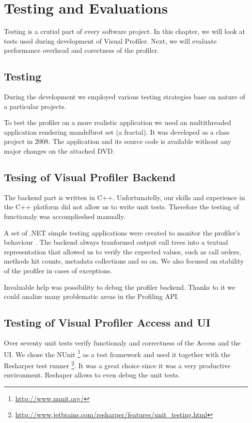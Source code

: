 \chapter{Testing and Evaluations}
Testing is a crutial part of every software project. In this chapter, we will look at tests used during development of Visual Profiler. Next, we will evaluate performance overhead and corectness of the profiler.

\section{Testing}
During the development we employed various testing strategies base on nature of a particular projects. 

To test the profiler on a more realistic application we used an multithreaded application rendering mandelbrot set (a fractal). It was developed as a class project in 2008. The application and its source code is available without any major changes on the attached DVD. 

\section{Tesing of Visual Profiler Backend}
The backend part is written in C++. Unfortunatelly, our skills and experience in the C++ platform did not allow us to write unit tests. Therefore the testing of functionaly was accomplieshed manually. 

A set of .NET simple testing applications were created to monitor  the profiler's behaviour . The backend always tranformed output call trees into a textual representation that allowed us to verify the expected values, such as call orders, methods hit counts, metadata collections and so on. We also focused on stability of the profiler in cases of exceptions.

Invaluable help was possibility to debug the profiler backend. Thanks to it we could analize many problematic areas in the Profiling API.

\section{Testing of Visual Profiler Access and UI}
Over seventy unit tests verify functionaly and correctness of the Access and the UI. We chose the NUnit \footnote{\href{http://www.nunit.org/}{http://www.nunit.org/}} as a test framework and used it together with the Resharper test runner \footnote{\href{http://www.jetbrains.com/resharper/features/unit_testing.html}{http://www.jetbrains.com/resharper/features/unit\_testing.html}}. It was a great choice since it was a very productive environment. Reshaper allows to even debug the unit tests.

